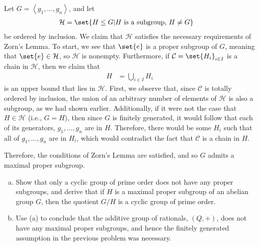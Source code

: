 \documentclass[10pt]{mypackage}
\begin{document}
\begin{solution}
  Let $G = \left\langle g_1,\dots,g_n \right\rangle$, and let
  \begin{align*}
    \mathcal{H} &= \set{H\leq G | H\text{ is a subgroup, }H\neq G}
  \end{align*}
  be ordered by inclusion. We claim that $ \mathcal{H} $ satisfies the necessary requirements of Zorn's Lemma. To start, we see that $\set{e}$ is a proper subgroup of $G$, meaning that $ \set{e}\in \mathcal{H} $, so $ \mathcal{H} $ is nonempty. Furthermore, if $ \mathcal{C} = \set{H_i}_{i\in I} $ is a chain in $ \mathcal{H} $, then we claim that
  \begin{align*}
    H &= \bigcup_{i\in I}H_i
  \end{align*}
  is an upper bound that lies in $ \mathcal{H} $. First, we observe that, since $ \mathcal{C} $ is totally ordered by inclusion, the union of an arbitrary number of elements of $ \mathcal{H} $ is also a subgroup, as we had shown earlier. Additionally, if it were not the case that $ H\in \mathcal{H} $ (i.e., $G = H$), then since $G$ is finitely generated, it would follow that each of its generators, $ g_1,\dots,g_n $ are in $H$. Therefore, there would be some $H_i$ such that all of $g_1,\dots,g_n$ are in $H_i$, which would contradict the fact that $ \mathcal{C} $ is a chain in $H$.\newline

  Therefore, the conditions of Zorn's Lemma are satisfied, and so $G$ admits a maximal proper subgroup.
\end{solution}
\begin{problem}[Problem 10]\hfill
  \begin{enumerate}[(a)]
    \item Show that only a cyclic group of prime order does not have any proper subgroups, and derive that if $H$ is a maximal proper subgroup of an abelian group $G$, then the quotient $ G / H $ is a cyclic group of prime order.
    \item Use (a) to conclude that the additive group of rationals, $\left( Q,+ \right)$, does not have any maximal proper subgroups, and hence the finitely generated assumption in the previous problem was necessary.
  \end{enumerate}
\end{problem}
\end{document}
